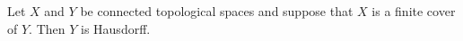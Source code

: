 Let $X$ and $Y$ be connected topological spaces and suppose that $X$
is a finite cover of $Y$. Then $Y$ is Hausdorff.
